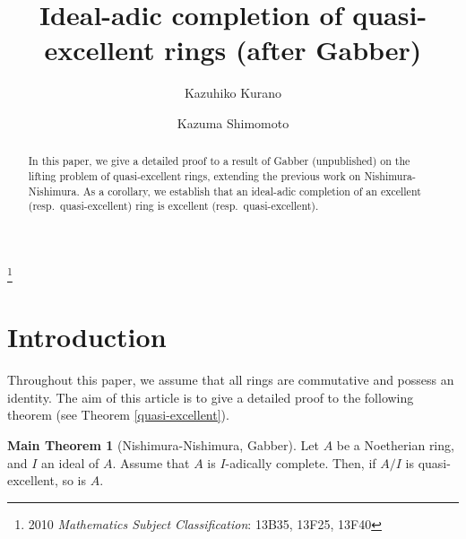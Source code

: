 \documentclass[11pt,a4paper]{amsart}
\theoremstyle{definition}
\newtheorem{maintheorema}{Main Theorem}
\theoremstyle{remark}
\begin{document}
\title[Ideal-adic completion of quasi-excellent rings (after Gabber)]
{Ideal-adic completion of quasi-excellent rings (after Gabber)}

\author[K. Kurano]{Kazuhiko Kurano}
\address{Department of Mathematics, School of Science and Technology,
Meiji University, Higashimata 1-1-1, Tama-ku, Kawasaki 214-8571, Japan}


\author[K. Shimomoto]{Kazuma Shimomoto}
\address{Department of Mathematics, College of Humanities and Sciences, Nihon University, Setagaya-ku, Tokyo 156-8550, Japan}

\thanks{2010 {\em Mathematics Subject Classification\/}: 13B35, 13F25, 13F40}



\begin{abstract}
In this paper, we give a detailed proof to a result of Gabber (unpublished) on the lifting problem of quasi-excellent rings, extending the previous work on Nishimura-Nishimura. As a corollary, we establish that an ideal-adic completion of an excellent (resp.\ quasi-excellent) ring is excellent  (resp.\ quasi-excellent).
\end{abstract}

\maketitle

\setcounter{section}{0}



\section{Introduction}

Throughout this paper, we assume that all rings are commutative and possess an identity. The aim of this article is to give a detailed proof to the following theorem (see Theorem \ref{quasi-excellent}).


\begin{maintheorema}[Nishimura-Nishimura, Gabber]
\label{MT1}
Let $A$ be a Noetherian ring, and $I$ an ideal of $A$. Assume that $A$ is $I$-adically complete. Then, if $A/I$ is quasi-excellent, so is $A$.
\end{maintheorema}
\end{document}
